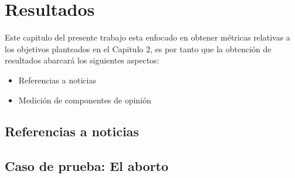 \section{Resultados}
	Este capitulo del presente trabajo esta enfocado en obtener métricas relativas a los objetivos planteados en el Capitulo 2, es por tanto que la obtención de resultados abarcará los siguientes aspectos:
	
	\begin{itemize}
		\item Referencias a noticias
		\item Medición de componentes de opinión  
	\end{itemize}

\subsection{Referencias a noticias}\label{subsec:refnoticias}

	
	
\newpage	
\subsection{Caso de prueba: El aborto}

	